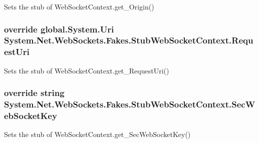 Sets the stub of Web\-Socket\-Context.\-get\-\_\-\-Origin()

\hypertarget{class_system_1_1_net_1_1_web_sockets_1_1_fakes_1_1_stub_web_socket_context_ab9c4947dcb3afda80ccd2fcf2d7cf598}{
\subsubsection[{Request\-Uri}]{\setlength{\rightskip}{0pt plus 5cm}override global.\-System.\-Uri System.\-Net.\-Web\-Sockets.\-Fakes.\-Stub\-Web\-Socket\-Context.\-Request\-Uri\hspace{0.3cm}{\ttfamily [get]}}}\label{class_system_1_1_net_1_1_web_sockets_1_1_fakes_1_1_stub_web_socket_context_ab9c4947dcb3afda80ccd2fcf2d7cf598}


Sets the stub of Web\-Socket\-Context.\-get\-\_\-\-Request\-Uri()

\hypertarget{class_system_1_1_net_1_1_web_sockets_1_1_fakes_1_1_stub_web_socket_context_abc2d062c2c8a8fc19d5c24fdcee5fca6}{
\subsubsection[{Sec\-Web\-Socket\-Key}]{\setlength{\rightskip}{0pt plus 5cm}override string System.\-Net.\-Web\-Sockets.\-Fakes.\-Stub\-Web\-Socket\-Context.\-Sec\-Web\-Socket\-Key\hspace{0.3cm}{\ttfamily [get]}}}\label{class_system_1_1_net_1_1_web_sockets_1_1_fakes_1_1_stub_web_socket_context_abc2d062c2c8a8fc19d5c24fdcee5fca6}


Sets the stub of Web\-Socket\-Context.\-get\-\_\-\-Sec\-Web\-Socket\-Key()


